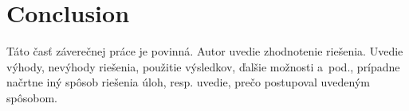 \section{Conclusion}

Táto časť\/ záverečnej práce je povinná. Autor uvedie zhodnotenie
riešenia. Uvedie výhody, nevýhody riešenia,  použitie výsledkov, ďalšie
možnosti a~pod., prípadne načrtne iný spôsob riešenia úloh, resp.
uvedie, prečo postupoval uvedeným spôsobom.